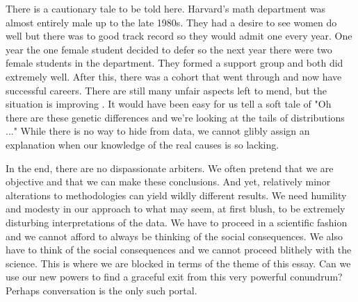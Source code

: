 There is a cautionary tale to be told here.
Harvard's math department was almost entirely male up to the late 1980s.
They had a desire to see women do well but there was to good track record so they would admit one every year.
One year the one female student decided to defer so the next year there were two female students in the department.
They formed a support group and both did extremely well.
After this, there was a cohort that went through and now have successful careers.
There are still many unfair aspects left to mend, but the situation is improving \cite{Jackson2004}.
It would have been easy for us tell a soft tale of "Oh there are these genetic differences and we're looking at the tails of distributions ..."
While there is no way to hide from data, we cannot glibly assign an explanation when our knowledge of the real causes is so lacking.

In the end, there are no dispassionate arbiters.
We often pretend that we are objective and that we can make these conclusions.
And yet, relatively minor alterations to methodologies can yield wildly different results.
We need humility and modesty in our approach to what may seem, at first blush, to be extremely disturbing interpretations of the data.
We have to proceed in a scientific fashion and we cannot afford to always be thinking of the social consequences.
We also have to think of the social consequences and we cannot proceed blithely with the science.
This is where we are blocked in terms of the theme of this essay.
Can we use our new powers to find a graceful exit from this very powerful conundrum?
Perhaps conversation is the only such portal.
